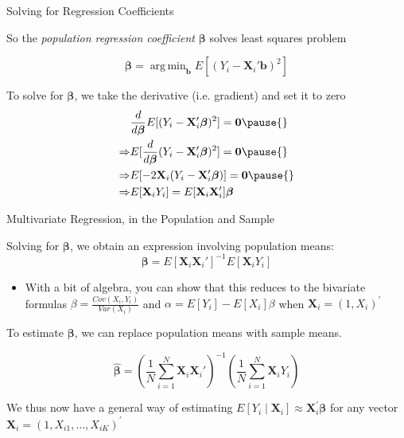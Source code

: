 \documentclass[11pt,english,handout]{beamer}
\newenvironment{wideitemize}{\itemize\addtolength{\itemsep}{10pt}}{\enditemize}
\DeclareMathOperator*{\argmin}{arg\,min}
\begin{document}
	\begin{frame}{Solving for Regression Coefficients}
		\begin{wideitemize}
			\item
			So the \emph{population regression coefficient} $\boldsymbol\beta$ solves least squares problem
						
			$$\bm{\beta} = \argmin_{\mathbf{b}} E[ (Y_i - \mathbf{X}_i '\mathbf{b})^2]$$
			
			\pause
			\item
			To solve for $\bm{\beta}$, we take the derivative (i.e. gradient) and set it to zero
			\begin{align*}
				& \dfrac{d}{d \bm{\beta}} E[ (Y_i - \mathbf{X}_i '\bm{\beta})^2] = \mathbf{0} \pause{} \\
				\Rightarrow & E[ \dfrac{d}{d \bm{\beta}} (Y_i - \mathbf{X}_i '\bm{\beta})^2] = \mathbf{0} \pause{} \\
				\Rightarrow & E[-2 \mathbf{X}_i (Y_i - \mathbf{X}_i '\bm{\beta})] = \mathbf{0} \pause{}\\
				\Rightarrow & E[\mathbf{X}_i Y_i] = E[\mathbf{X}_i \mathbf{X}_i ']\bm{\beta}
			\end{align*}
		
	
		\end{wideitemize}
	\end{frame}
	
	
	\begin{frame}{Multivariate Regression, in the Population and Sample}
		\begin{wideitemize}
			\item
			Solving for $\bm{\beta}$, we obtain an expression involving population means:
			$$\bm{\beta} = E[ \bm{X}_i \bm{X}_i'  ]^{-1} E[\bm{X}_i Y_i] $$
			\vspace{-0.3cm}
			\begin{itemize}
			\item With a bit of algebra, you can show that this reduces to the bivariate formulas $\beta=\frac{Cov(X_i,Y_i)}{Var(X_i)}$ and $\alpha=E[Y_i]-E[X_i]\beta$ when $\mathbf{X}_i=(1,X_i)^\prime$
			\end{itemize}
			\pause\smallskip
			\item
			To estimate $\bm{\beta}$, we can replace population means with sample means. 
			
			\pause
			$$ \bm{\hat\beta} = \left( \frac{1}{N} \sum_{i=1}^N \bm{X}_i \bm{X}_i' \right)^{-1}  \left( \frac{1}{N} \sum_{i=1}^N \bm{X}_i Y_i \right)$$
			
			\pause\smallskip
			\item 
			We thus now have a general way of estimating $E[Y_i\mid \mathbf{X}_i]\approx \mathbf{X}_i^\prime\boldsymbol{\beta}$ for any vector $\mathbf{X}_i=(1,X_{i1},\dots,X_{iK})^\prime$ 
		\end{wideitemize}
	\end{frame}
	
\end{document}
